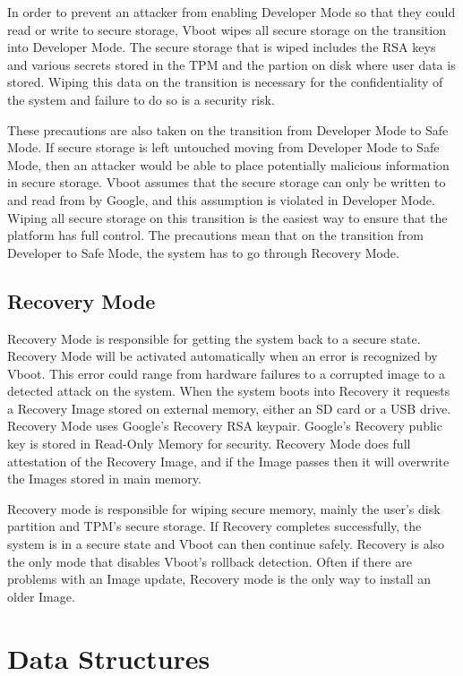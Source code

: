 In order to prevent an attacker from enabling Developer Mode so that they could
read or write to secure storage, Vboot wipes all secure storage on the transition into Developer Mode.
The secure storage that is wiped includes the RSA keys and various secrets stored in the TPM and the partion on disk where user data is stored.
Wiping this data on the transition is necessary for the confidentiality of the system and failure to do so is a security risk.

These precautions are also taken on the transition from Developer Mode to Safe Mode. 
If secure storage is left untouched moving from Developer Mode to Safe Mode, then an attacker would be able to place potentially malicious information in secure storage.
Vboot assumes that the secure storage can only be written to and read from by
Google, and this assumption is violated in Developer Mode. 
Wiping all secure storage on this transition is the easiest way to ensure that the platform has full control.
The precautions mean that on the transition from Developer to Safe Mode, the system has to go through Recovery Mode.

\subsection{Recovery Mode}

Recovery Mode is responsible for getting the system back to a secure state.
Recovery Mode will be activated automatically when an error is recognized by Vboot.
This error could range from hardware failures to a corrupted image to a detected attack on the system.
When the system boots into Recovery it requests a Recovery Image stored on external memory, either an SD card or a USB drive.
Recovery Mode uses Google's Recovery RSA keypair.
Google's Recovery public key is stored in Read-Only Memory for security.
Recovery Mode does full attestation of the Recovery Image, and if the Image
passes then it will overwrite the Images stored in main memory.

Recovery mode is responsible for wiping secure memory, mainly the user's disk partition and TPM's secure storage.
If Recovery completes successfully, the system is in a secure state and Vboot can then continue safely.
Recovery is also the only mode that disables Vboot's rollback detection.
Often if there are problems with an Image update, Recovery mode is the only way
to install an older Image. 

\section{Data Structures}\label{sec:data-structures}

